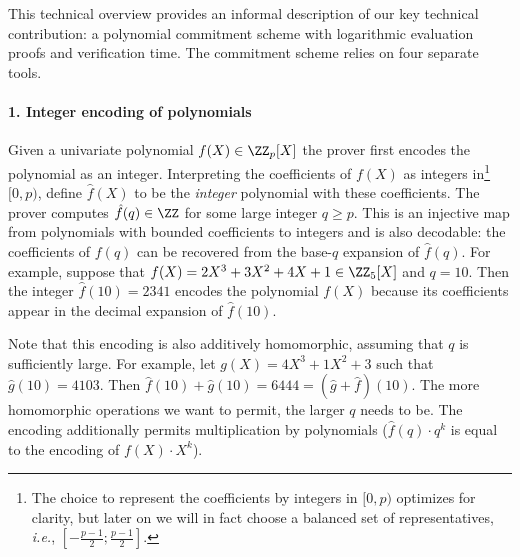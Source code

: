 This technical overview provides an informal description of our key technical contribution: a polynomial commitment scheme with logarithmic evaluation proofs and verification time.
The commitment scheme relies on four separate tools.
\paragraph{1. Integer encoding of polynomials}
Given a univariate polynomial $f(X)\in \ZZ_p[X]$ the prover first encodes the polynomial as an integer. Interpreting the coefficients of $f(X)$ as integers in\footnote{The choice to represent the coefficients by integers in $[0,p)$ optimizes for clarity, but later on we will in fact choose a balanced set of representatives, \emph{i.e.}, $[-\frac{p-1}{2}; \frac{p-1}{2}]$.} $[0, p)$, define $\hat{f}(X)$ to be the \emph{integer} polynomial with these coefficients. The prover computes $\hat{f}(q)\in \ZZ$ for some large integer $q\geq p$. This is an injective map from polynomials with bounded coefficients to integers and is also decodable: the coefficients of $f(q)$ can be recovered from the base-$q$ expansion of $\hat{f}(q)$. For example, suppose that $f(X)=2X^3+3X^2+4X+1 \in \ZZ_5[X]$ and $q=10$. Then the integer $\hat{f}(10)=2341$ encodes the polynomial $f(X)$ because its coefficients appear in the decimal expansion of $\hat{f}(10)$.

Note that this encoding is also additively homomorphic, assuming that $q$ is sufficiently large. 
For example, let $g(X)=4X^3+1X^2+3$ such that $\hat{g}(10)=4103$. Then $\hat{f}(10)+\hat{g}(10)=6444=(\hat{g}+\hat{f})(10)$. 
The more homomorphic operations we want to permit, the larger $q$ needs to be.
The encoding additionally permits multiplication by polynomials ($\hat{f}(q)\cdot q^k$ is equal to the encoding of $f(X)\cdot X^k$). 
\begin{comment}
Or in our example $100 \cdot f(10)=234100$ which is the encoding of $2\cdot X^5+3\cdot X^4+4\cdot X^3+X^2$.
\end{comment}

